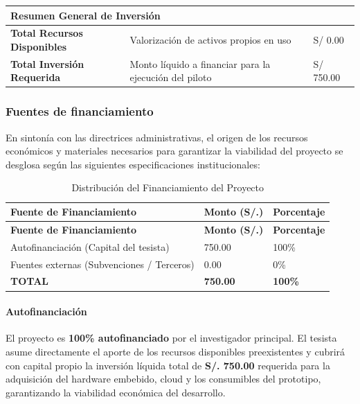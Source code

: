 \documentclass[12pt,a4paper]{article}
\begin{document}
\begin{longtable}{@{} p{} p{} p{} @{}}
	\midrule
	\multicolumn{3}{l}{\textbf{Resumen General de Inversión}} \\
	\midrule
	\textbf{Total Recursos Disponibles} & Valorización de activos propios en uso & S/ 0.00 \\
	\textbf{Total Inversión Requerida} & Monto líquido a financiar para la ejecución del piloto & S/ 750.00 \\
\end{longtable}
\endgroup

\subsubsection{Fuentes de financiamiento}

En sintonía con las directrices administrativas, el origen de los recursos económicos y materiales necesarios para garantizar la viabilidad del proyecto se desglosa según las siguientes especificaciones institucionales:

\begingroup
\small

\begin{longtable}{@{} p{} p{} p{} @{}}
	\caption{Distribución del Financiamiento del Proyecto} \label{tab:distribucion-financiamiento} \\
	\toprule
	\textbf{Fuente de Financiamiento} & \textbf{Monto (S/.)} & \textbf{Porcentaje} \\
	\midrule
	\endfirsthead
	
	\toprule
	\textbf{Fuente de Financiamiento} & \textbf{Monto (S/.)} & \textbf{Porcentaje} \\
	\midrule
	\endhead
	
	\bottomrule
	\endlastfoot
	
	Autofinanciación (Capital del tesista) & 750.00 & 100\% \\
	Fuentes externas (Subvenciones / Terceros) & 0.00 & 0\% \\
	\addlinespace
	\midrule
	\textbf{TOTAL} & \textbf{750.00} & \textbf{100\%} \\
\end{longtable}
\endgroup

\paragraph{Autofinanciación}
El proyecto es \textbf{100\% autofinanciado} por el investigador principal. El tesista asume directamente el aporte de los recursos disponibles preexistentes y cubrirá con capital propio la inversión líquida total de \textbf{S/. 750.00} requerida para la adquisición del hardware embebido, cloud y los consumibles del prototipo, garantizando la viabilidad económica del desarrollo.
\end{document}

